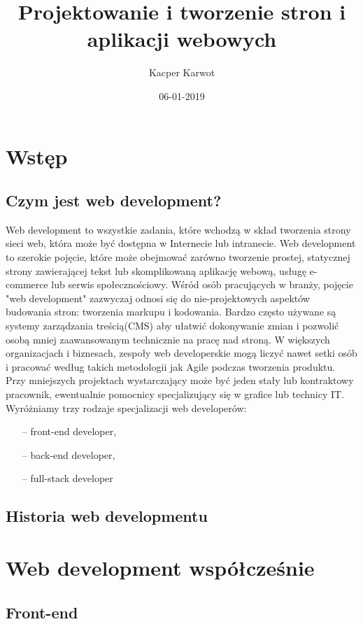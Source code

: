 \documentclass{report}
\title{Projektowanie i tworzenie stron i aplikacji webowych}
\date{06-01-2019}
\author{Kacper Karwot}
\begin{document}
	\maketitle
	\newpage
	\chapter{Wstęp}
	\section{Czym jest web development?}
	Web development to wszystkie zadania, które wchodzą w skład tworzenia strony sieci web, która może być dostępna w Internecie lub intranecie. 
	Web development to szerokie pojęcie, które może obejmować zarówno tworzenie prostej, statycznej strony zawierającej tekst lub 			skomplikowaną aplikację webową, usługę e-commerce lub serwis społecznościowy. 
 Wśród osób pracujących w branży, pojęcie "web development" zazwyczaj odnosi się do nie-projektowych aspektów budowania stron: tworzenia markupu i kodowania. Bardzo często używane są systemy zarządzania treścią(CMS) aby ułatwić dokonywanie zmian i pozwolić osobą mniej zaawansowanym technicznie na pracę nad stroną.
 	\newline
 	W większych organizacjach i biznesach, zespoły web developerskie mogą liczyć nawet setki osób i pracować według takich metodologii jak Agile podczas tworzenia produktu. Przy mniejszych projektach wystarczający może być jeden stały lub kontraktowy pracownik, ewentualnie pomocnicy specjalizujący się w grafice lub technicy IT. 
	\newline
	Wyróżniamy trzy rodzaje specjalizacji web developerów:
	\begin{itemize}
	\item[--] front-end developer,
	\item[--] back-end developer,
	\item[--] full-stack developer
 	\end{itemize}
 	\newpage
	\section{Historia web developmentu}
	
	\newpage 
	\chapter{Web development współcześnie}
	\section{Front-end}
	\newpage
\end{document}
